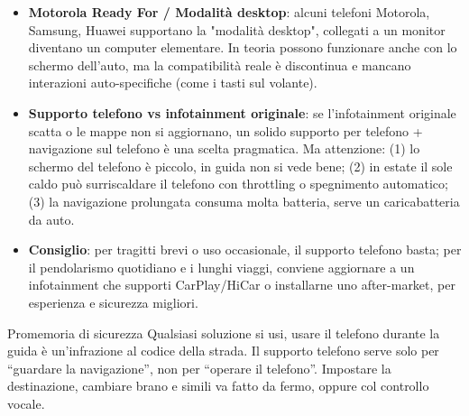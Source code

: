 \begin{itemize}
  \item \textbf{Motorola Ready For / Modalità desktop}: alcuni telefoni Motorola, Samsung, Huawei supportano la "modalità desktop", collegati a un monitor diventano un computer elementare. In teoria possono funzionare anche con lo schermo dell'auto, ma la compatibilità reale è discontinua e mancano interazioni auto-specifiche (come i tasti sul volante).
  \item \textbf{Supporto telefono vs infotainment originale}: se l'infotainment originale scatta o le mappe non si aggiornano, un solido supporto per telefono + navigazione sul telefono è una scelta pragmatica. Ma attenzione: (1) lo schermo del telefono è piccolo, in guida non si vede bene; (2) in estate il sole caldo può surriscaldare il telefono con throttling o spegnimento automatico; (3) la navigazione prolungata consuma molta batteria, serve un caricabatteria da auto.
  \item \textbf{Consiglio}: per tragitti brevi o uso occasionale, il supporto telefono basta; per il pendolarismo quotidiano e i lunghi viaggi, conviene aggiornare a un infotainment che supporti CarPlay/HiCar o installarne uno after-market, per esperienza e sicurezza migliori.
\end{itemize}

\begin{tcbwarn}{Promemoria di sicurezza}
Qualsiasi soluzione si usi, usare il telefono durante la guida è un'infrazione al codice della strada. Il supporto telefono serve solo per “guardare la navigazione”, non per “operare il telefono”. Impostare la destinazione, cambiare brano e simili va fatto da fermo, oppure col controllo vocale.

\end{tcbwarn}


